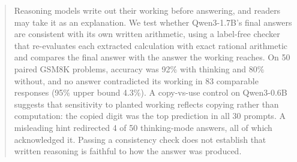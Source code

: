 \begin{abstract}
Reasoning models write out their working before answering, and readers may take it as
an explanation. We test whether Qwen3-1.7B's final answers are consistent with its own
written arithmetic, using a label-free checker that re-evaluates each extracted
calculation with exact rational arithmetic and compares the final answer with the
answer the working reaches. On 50 paired GSM8K problems, accuracy was 92\% with
thinking and 80\% without, and no answer contradicted its working in 83 comparable
responses (95\% upper bound 4.3\%). A copy-vs-use control on Qwen3-0.6B suggests that
sensitivity to planted working reflects copying rather than computation: the copied
digit was the top prediction in all 30 prompts. A misleading hint redirected 4 of 50
thinking-mode answers, all of which acknowledged it. Passing a consistency check does
not establish that written reasoning is faithful to how the answer was produced.
\end{abstract}
